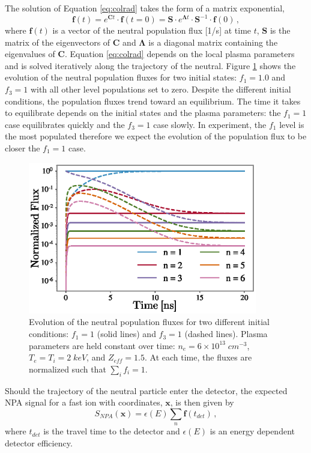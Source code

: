 The solution of Equation \ref{eq:colrad} takes the form of a matrix exponential,
\begin{equation} \label{eq:neutral_flux}
    \mathbf{f}(t) = e^{\mathbf{C} t} \cdot \mathbf{f}(t=0) = \mathbf{S} \cdot e^{\mathbf{\Lambda} t} \cdot \mathbf{S}^{-1} \cdot \mathbf{f}(0)\,,
\end{equation}
where $\mathbf{f}(t)$ is a vector of the neutral population flux [1/s] at time $t$, $\mathbf{S}$ is the matrix of the eigenvectors of $\mathbf{C}$ and $\mathbf{\Lambda}$ is a diagonal matrix containing the eigenvalues of $\mathbf{C}$.
Equation \ref{eq:colrad} depends on the local plasma parameters and is solved iteratively along the trajectory of the neutral. Figure \ref{fig:f_evolution} shows the evolution of the neutral population fluxes for two initial states: $f_1 = 1.0$ and $f_3=1$ with all other level populations set to zero. Despite the different initial conditions, the population fluxes trend toward an equilibrium. The time it takes to equilibrate depends on the initial states and the plasma parameters: the $f_1=1$ case equilibrates quickly and the $f_3=1$ case slowly. In experiment, the $f_1$ level is the most populated therefore we expect the evolution of the population flux to be closer the $f_1=1$ case.
\begin{figure}[ht]
    \centering
    \includegraphics[width=10cm]{figures/f_evolution.eps}
    \caption{Evolution of the neutral population fluxes for two different initial conditions: $f_1=1$ (solid lines) and $f_3=1$ (dashed lines). Plasma parameters are held constant over time: $n_e = 6\times10^{13}\;cm^{-3}$, $T_e=T_i = 2\;keV$, and $Z_{eff} = 1.5$. At each time, the fluxes are normalized such that $\sum_i f_i = 1$.}
    \label{fig:f_evolution}
\end{figure}

Should the trajectory of the neutral particle enter the detector, the expected NPA signal for a fast ion with coordinates, $\mathbf{x}$, is then given by
\begin{equation}\label{eq:npa_weight}
    S_{NPA}(\mathbf{x}) = \epsilon(E) \sum_n \mathbf{f}(t_{det})\,,
\end{equation}
where $t_{det}$ is the travel time to the detector and $\epsilon(E)$ is an energy dependent detector efficiency.

